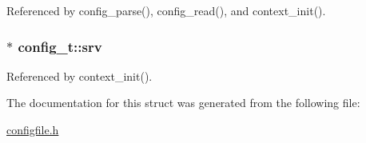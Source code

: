 Referenced by config\-\_\-parse(), config\-\_\-read(), and context\-\_\-init().

\hypertarget{structconfig__t_a8d3dd3a1ab542e07c899c3b056acd463}{
\subsubsection[{srv}]{$\ast$ config\-\_\-t\-::srv}}\label{structconfig__t_a8d3dd3a1ab542e07c899c3b056acd463}


Referenced by context\-\_\-init().



The documentation for this struct was generated from the following file\-:\begin{DoxyCompactItemize}
\item 
\hyperlink{configfile_8h}{configfile.\-h}\end{DoxyCompactItemize}
